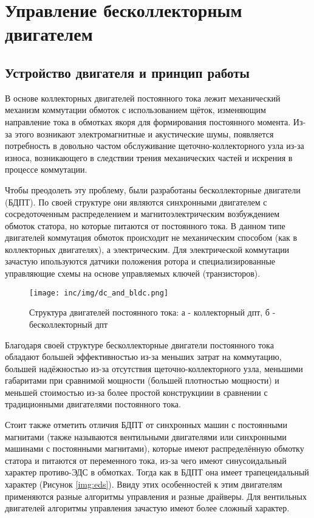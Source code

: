 \chapter{Управление бесколлекторным двигателем}
\label{cha:chap1}

\section{Устройство двигателя и принцип работы}
\label{sec:bldc_theory}

В основе коллекторных двигателей постоянного тока лежит механический механизм коммутации обмоток с использованием щёток, изменяющим направление тока в обмотках якоря для формирования постоянного момента. Из-за этого возникают электромагнитные и акустические шумы, появляется потребность в довольно частом обслуживание щеточно-коллекторного узла из-за износа, возникающего в следствии трения механических частей и искрения в процессе коммутации. \cite{book.kim_motors}

Чтобы преодолеть эту проблему, были разработаны бесколлекторные двигатели (БДПТ). По своей структуре они являются синхронными двигателем с сосредоточенным распределением и магнитоэлектрическим возбуждением обмоток статора, но которые питаются от постоянного тока. В данном типе двигателей коммутация обмоток происходит не механическим способом (как в коллекторных двигателях), а электрическим. Для электрической коммутации зачастую ипользуются датчики положения ротора и специализированные управляющие схемы на основе управляемых ключей (транзисторов). \cite{book.itmo_motors,book.kim_motors}

\begin{figure}[!h]
\centering
\texttt{[image: inc/img/dc\_and\_bldc.png]}
\caption{Структура двигателей постоянного тока: а - коллекторный дпт, б - бесколлекторный дпт \cite{book.bldc_dummy}}
\end{figure}

Благодаря своей структуре бесколлекторные двигатели постоянного тока обладают большей эффективностью из-за меньших затрат на коммутацию, большей надёжностью из-за отсутствия щеточно-коллекторного узла, меньшими габаритами при сравнимой мощности (большей плотностью мощности) и меньшей стоимостью из-за более простой конструкциии в сравнении с традиционными двигателями постоянного тока.

Стоит также отметить отличия БДПТ от синхронных машин с постоянными магнитами (также называются вентильными двигателями или синхронными машинами с постоянными магнитами), которые имеют распределённую обмотку статора и питаются от переменного тока, из-за чего имеют синусоидальный характер противо-ЭДС в обмотках. Тогда как в БДПТ она имеет трапецеидальный характер (Рисунок \ref{img:eds}). Ввиду этих особенностей к этим двигателям применяются разные алгоритмы управления и разные драйверы. Для вентильных двигателей алгоритмы управления зачастую имеют более сложный характер.

